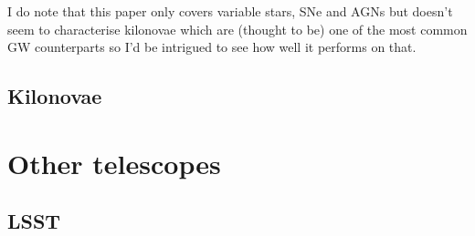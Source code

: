 \documentclass[twocolumn]{aastex631}
\newcommand{\placeholder}[1]{{\color{gray} \lipsum[#1]}}
\begin{document}
I do note that this paper only covers variable stars, SNe and AGNs but doesn't seem to characterise kilonovae which are (thought to be) one of the most common GW counterparts so I'd be intrigued to see how well it performs on that.

\subsection{Kilonovae}
\citet{Chase+2022}
\placeholder{7}

\section{Other telescopes}
\subsection{LSST}
\citet{Andreoni+2022}
\placeholder{8}


{}
\end{document}

